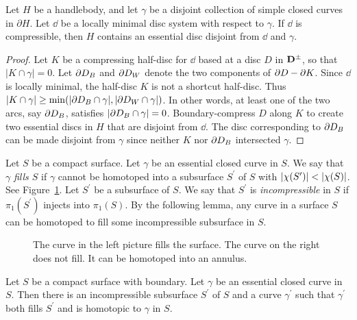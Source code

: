 \begin{lemma}
\label{no waves}
Let $H$ be a handlebody, and let $\gamma$ be a disjoint collection
of simple closed curves in $\partial H$.
Let $\dd$ be a locally minimal disc system with respect to $\gamma$.  
If $\dd$ is compressible, then $H$ contains an essential disc disjoint
from $\dd$ and $\gamma$.
\end{lemma}

\begin{proof}
Let $K$ be a compressing half-disc for $\dd$ based at a disc $D$ in $\mathbf{D}^\pm$, so that $|K\cap\gamma|=0$.  Let $\partial D_B$ and $\partial D_W$ denote the two components of $\partial D-\partial K$.  Since $\dd$ is locally minimal, the half-disc $K$ is not a shortcut half-disc.  Thus $|K\cap\gamma|\geq\min(|\partial D_B\cap\gamma|,|\partial D_W\cap\gamma|)$.  In other words, at least one of the two arcs, say $\partial D_B$, satisfies $|\partial D_B\cap\gamma|=0$.  Boundary-compress $D$ along $K$ to create two essential discs in $H$ that are disjoint from $\dd$.  The disc corresponding to $\partial D_B$ can be made disjoint from $\gamma$ since neither $K$ nor $\partial D_B$ intersected $\gamma$.
\end{proof}

Let $S$ be a compact surface.  Let $\gamma$ be an essential closed curve in $S$.  We say that $\gamma$ \emph{fills $S$} if $\gamma$ cannot be homotoped into a subsurface $S^\prime$ of $S$ with $\ec{S^\prime}<\ec{S}$.  See Figure~\ref{fillingcurve}.  Let $S^\prime$ be a subsurface of $S$.  We say that $S^\prime$ is \emph{incompressible} in $S$ if $\pi_1(S^\prime)$ injects into $\pi_1(S)$.  By the following lemma, any curve in a surface $S$ can be homotoped to fill some incompressible subsurface in $S$.

\begin{figure}
\caption{The curve in the left picture fills the surface.  The curve on the right does not fill.  It can be homotoped into an annulus.}
\label{fillingcurve}
\end{figure}


\begin{lemma}
\label{full}
Let $S$ be a compact surface with boundary.  Let $\gamma$ be an 
essential closed curve in $S$.  Then there is an incompressible subsurface $S^\prime$ of $S$ and a curve $\gamma^\prime$ such that $\gamma^{\prime}$ both fills $S^{\prime}$ and is homotopic to $\gamma$ in $S$.
\end{lemma}

